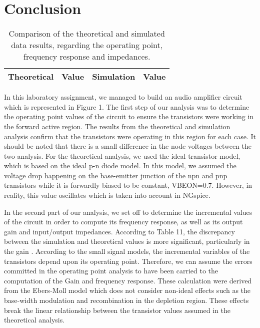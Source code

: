 \section{Conclusion}
\label{sec:conclusion}
\begin{table}[!h]
  \centering
  \begin{tabular}{c c c c}
    \hline    
    {\bf Theoretical} & {\bf Value} & {\bf Simulation} & {\bf Value}\\ \hline
     
  \end{tabular}
  \caption{Comparison of the theoretical and simulated data results, regarding the operating point, frequency response and impedances.}
  \label{tab:comp}
\end{table}

In this laboratory assignment, we managed to build an audio amplifier circuit which is represented in Figure 1. The first step of our analysis was to determine the operating point values of the circuit to ensure the transistors were working in the forward active region. The results from the theoretical and simulation analysis confirm that the transistors were operating in this region for each case. It should be noted that there is a small difference in the node voltages between the two analysis. For the theoretical analysis, we used the ideal transistor model, which is based on the ideal p-n diode model. In this model, we assumed the voltage drop happening on the base-emitter junction of the npn and pnp transistors while it is forwardly biased to be constant, VBEON=0.7. However, in reality, this value oscillates which is taken into account in NGspice.

In the second part of our analysis, we set off to determine the incremental values of the circuit in order to compute its frequency response, as well as its output gain and input/output impedances. According to Table 11, the discrepancy between the simulation and theoretical values is more significant, particularly in the gain . According to the small signal models, the incremental variables of the transistors depend upon its operating point. Therefore, we can assume the errors committed in the operating point analysis to have been carried to the computation of the Gain and frequency response. These calculation were derived from the Ebers-Moll model which does not consider non-ideal effects such as the base-width modulation and recombination in the depletion region. These effects break the linear relationship between the transistor values assumed in the theoretical analysis.

